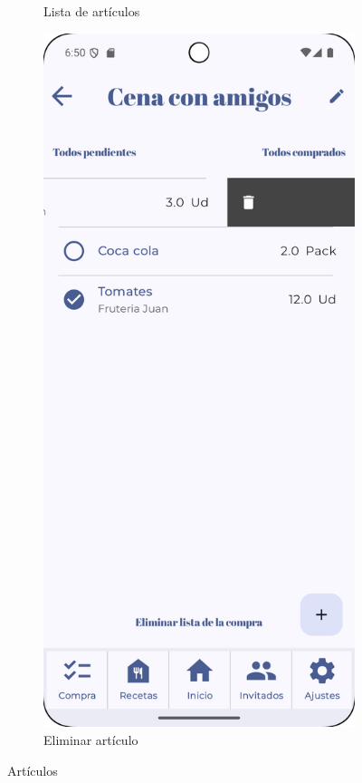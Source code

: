 \begin{figure}[H]
\begin{subfigure}[b]{0.3\textwidth}
      \caption{Lista de artículos}
      \label{fig:items}
    \end{subfigure}
    \hfill
    \begin{subfigure}[b]{0.3\textwidth}
      \includegraphics[width=\textwidth]{./img/manual/delete_item.png}
      \caption{Eliminar artículo}
      \label{fig:delete-item}
    \end{subfigure}

    \caption{Artículos}
    \label{fig:items-detail}
\end{figure}

